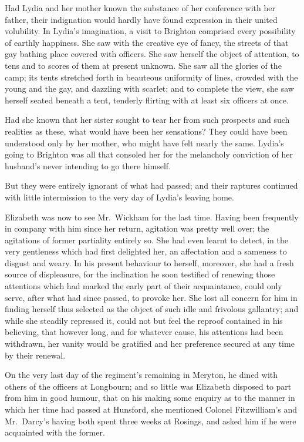 Had Lydia and her mother known the substance of her
conference with her father, their indignation would hardly
have found expression in their united volubility. In
Lydia’s imagination, a visit to Brighton comprised every
possibility of earthly happiness. She saw with the creative
eye of fancy, the streets of that gay bathing place covered
with officers. She saw herself the object of attention, to
tens and to scores of them at present unknown. She saw
all the glories of the camp; its tents stretched forth in
beauteous uniformity of lines, crowded with the young
and the gay, and dazzling with scarlet; and to complete
the view, she saw herself seated beneath a tent, tenderly
flirting with at least six officers at once.

Had she known that her sister sought to tear her from
such prospects and such realities as these, what would
have been her sensations? They could have been understood
only by her mother, who might have felt nearly
the same. Lydia’s going to Brighton was all that
consoled her for the melancholy conviction of her husband’s
never intending to go there himself.

But they were entirely ignorant of what had passed;
and their raptures continued with little intermission to the
very day of Lydia’s leaving home.

Elizabeth was now to see Mr.\ Wickham for the last
time. Having been frequently in company with him since
her return, agitation was pretty well over; the agitations
of former partiality entirely so. She had even learnt to
detect, in the very gentleness which had first delighted
her, an affectation and a sameness to disgust and weary.
In his present behaviour to herself, moreover, she had
a fresh source of displeasure, for the inclination he soon
testified of renewing those attentions which had marked
the early part of their acquaintance, could only serve,
after what had since passed, to provoke her. She lost
all concern for him in finding herself thus selected as the
object of such idle and frivolous gallantry; and while she
steadily repressed it, could not but feel the reproof contained
in his believing, that however long, and for whatever
cause, his attentions had been withdrawn, her vanity
would be gratified and her preference secured at any time
by their renewal.

On the very last day of the regiment’s remaining in
Meryton, he dined with others of the officers at Longbourn;
and so little was Elizabeth disposed to part from him
in good humour, that on his making some enquiry as to
the manner in which her time had passed at Hunsford,
she mentioned Colonel Fitzwilliam’s and Mr.\ Darcy’s
having both spent three weeks at Rosings, and asked
him if he were acquainted with the former.

